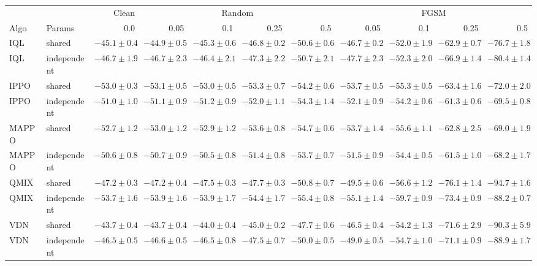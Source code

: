 \begin{tabular}{llrrrrrrrrr}
\toprule
 & & Clean & \multicolumn{4}{c}{Random} & \multicolumn{4}{c}{FGSM} \\
\cmidrule(lr){4-7}\cmidrule(lr){8-11}
Algo & Params & 0.0 & 0.05 & 0.1 & 0.25 & 0.5 & 0.05 & 0.1 & 0.25 & 0.5 \\
\midrule
IQL & shared & $-45.1\pm0.4$ & $-44.9\pm0.5$ & $-45.3\pm0.6$ & $-46.8\pm0.2$ & $-50.6\pm0.6$ & $-46.7\pm0.2$ & $-52.0\pm1.9$ & $-62.9\pm0.7$ & $-76.7\pm1.8$ \\
IQL & independent & $-46.7\pm1.9$ & $-46.7\pm2.3$ & $-46.4\pm2.1$ & $-47.3\pm2.2$ & $-50.7\pm2.1$ & $-47.7\pm2.3$ & $-52.3\pm2.0$ & $-66.9\pm1.4$ & $-80.4\pm1.4$ \\
\midrule
IPPO & shared & $-53.0\pm0.3$ & $-53.1\pm0.5$ & $-53.0\pm0.5$ & $-53.3\pm0.7$ & $-54.2\pm0.6$ & $-53.7\pm0.5$ & $-55.3\pm0.5$ & $-63.4\pm1.6$ & $-72.0\pm2.0$ \\
IPPO & independent & $-51.0\pm1.0$ & $-51.1\pm0.9$ & $-51.2\pm0.9$ & $-52.0\pm1.1$ & $-54.3\pm1.4$ & $-52.1\pm0.9$ & $-54.2\pm0.6$ & $-61.3\pm0.6$ & $-69.5\pm0.8$ \\
\midrule
MAPPO & shared & $-52.7\pm1.2$ & $-53.0\pm1.2$ & $-52.9\pm1.2$ & $-53.6\pm0.8$ & $-54.7\pm0.6$ & $-53.7\pm1.4$ & $-55.6\pm1.1$ & $-62.8\pm2.5$ & $-69.0\pm1.9$ \\
MAPPO & independent & $-50.6\pm0.8$ & $-50.7\pm0.9$ & $-50.5\pm0.8$ & $-51.4\pm0.8$ & $-53.7\pm0.7$ & $-51.5\pm0.9$ & $-54.4\pm0.5$ & $-61.5\pm1.0$ & $-68.2\pm1.7$ \\
\midrule
QMIX & shared & $-47.2\pm0.3$ & $-47.2\pm0.4$ & $-47.5\pm0.3$ & $-47.7\pm0.3$ & $-50.8\pm0.7$ & $-49.5\pm0.6$ & $-56.6\pm1.2$ & $-76.1\pm1.4$ & $-94.7\pm1.6$ \\
QMIX & independent & $-53.7\pm1.6$ & $-53.9\pm1.6$ & $-53.9\pm1.7$ & $-54.4\pm1.7$ & $-55.4\pm0.8$ & $-55.1\pm1.4$ & $-59.7\pm0.9$ & $-73.4\pm0.9$ & $-88.2\pm0.7$ \\
\midrule
VDN & shared & $-43.7\pm0.4$ & $-43.7\pm0.4$ & $-44.0\pm0.4$ & $-45.0\pm0.2$ & $-47.7\pm0.6$ & $-46.5\pm0.4$ & $-54.2\pm1.3$ & $-71.6\pm2.9$ & $-90.3\pm5.9$ \\
VDN & independent & $-46.5\pm0.5$ & $-46.6\pm0.5$ & $-46.5\pm0.8$ & $-47.5\pm0.7$ & $-50.0\pm0.5$ & $-49.0\pm0.5$ & $-54.7\pm1.0$ & $-71.1\pm0.9$ & $-88.9\pm1.7$ \\
\bottomrule
\end{tabular}